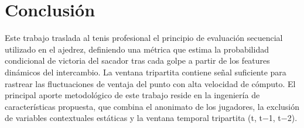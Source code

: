 \documentclass[journal]{IEEEtran}
\begin{document}
\begin{table}[htbp]
    \centering
    \caption{Cálculo del valor del tiro 4 mediante XGBoost}
    \label{tab:recorrido_tiro4}
    \renewcommand{\arraystretch}{1.25}
\end{table}

\section{Conclusión}
Este trabajo traslada al tenis profesional el principio de evaluación secuencial utilizado en el ajedrez, definiendo una métrica que estima la probabilidad condicional de victoria del sacador tras cada golpe a partir de los features dinámicos del intercambio. La ventana tripartita contiene señal suficiente para rastrear las fluctuaciones de ventaja del punto con alta velocidad de cómputo. El principal aporte metodológico de este trabajo reside en la ingeniería de características propuesta, que combina el anonimato de los jugadores, la exclusión de variables contextuales estáticas y la ventana temporal tripartita (t, t$-$1, t$-$2).
\end{document}
